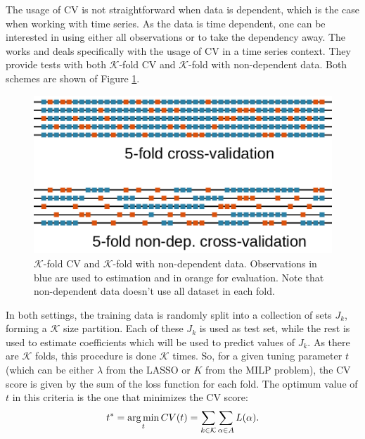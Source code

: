 The usage of CV is not straightforward when data is dependent, which is the case when working with time series. As the data is time dependent, one can be interested in using either all observations or to take the dependency away. The works
\cite{bergmeir_note_2017} and \cite{bergmeir_use_2012} deals specifically with the usage of CV in a time series context. They provide tests with both $\mathcal{K}$-fold CV and $\mathcal{K}$-fold with non-dependent data. Both schemes are shown of Figure \ref{fig:cross-validation-scheme}.
\begin{figure}
	\centering
	\includegraphics[width=0.9\linewidth]{../Figuras/Cross-validation-scheme}
	\caption{$\mathcal{K}$-fold CV and $\mathcal{K}$-fold with non-dependent data. Observations in blue are used to estimation and in orange for evaluation. Note that non-dependent data doesn't use all dataset in each fold.}
	\label{fig:cross-validation-scheme}
\end{figure}
In both settings, the training data is randomly split into a collection of sets $J_k$, forming a $\mathcal{K}$ size partition. Each of these $J_k$ is used as test set, while the rest is used to estimate coefficients which will be used to predict values of $J_k$. As there are $\mathcal{K}$ folds, this procedure is done $\mathcal{K}$ times. So, for a given tuning parameter $t$ (which can be either $\lambda$ from the LASSO or $K$ from the MILP problem), the CV score is given by the sum of the loss function for each fold. The optimum value of $t$ in this criteria is the one that minimizes the CV score:
\[
t^* = \operatorname*{arg\,min}_t CV(t) = \sum_{k \in \mathcal{K}} \sum_{\alpha \in A} L(\alpha).
\]




